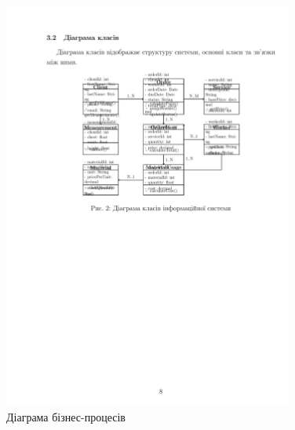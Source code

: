 \documentclass[14pt,a4paper]{extarticle}
\begin{document}
\begin{figure}[h!]
\centering
\includegraphics[width=0.85\textwidth]{diagrams/diagram-09.png}
\caption{Діаграма бізнес-процесів}
\end{figure}

\newpage
\end{document}
